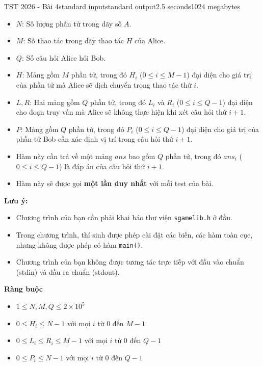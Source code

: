 \begin{problem}{TST 2026 - Bài 4}{standard input}{standard output}{2.5 seconds}{1024 megabytes}
\begin{itemize}
    \item $N$: Số lượng phần tử trong dãy số $A$.
    \item $M$: Số thao tác trong dãy thao tác $H$ của Alice.
    \item $Q$: Số câu hỏi Alice hỏi Bob.
    \item $H$: Mảng gồm $M$ phần tử, trong đó $H_i$ ($0\le i\le M-1$) đại diện cho giá trị của phần tử mà Alice sẽ dịch chuyển trong thao tác thứ $i$.
    \item $L, R$: Hai mảng gồm $Q$ phần tử, trong đó $L_i$ và $R_i$ ($0\le i\le Q-1$) đại diện cho đoạn truy vấn mà Alice sẽ không thực hiện khi xét câu hỏi thứ $i+1$.
    \item $P$: Mảng gồm $Q$ phần tử, trong đó $P_i$ ($0\le i\le Q-1$) đại diện cho giá trị của phần tử Bob cần xác định vị trí trong câu hỏi thứ $i+1$.
    \item Hàm này cần trả về một mảng $ans$ bao gồm $Q$ phần tử, trong đó $ans_i$ ($0\le i\le Q-1$) là đáp án của câu hỏi thứ $i+1$.
    \item Hàm này sẽ được gọi \textbf{một lần duy nhất} với mỗi test của bài.
\end{itemize}

\textbf{Lưu ý:}
\begin{itemize}
    \item Chương trình của bạn cần phải khai báo thư viện \texttt{sgamelib.h} ở đầu.
    \item Trong chương trình, thí sinh được phép cài đặt các biến, các hàm toàn cục, nhưng không được phép có hàm \texttt{main()}.
   \item Chương trình của bạn không được tương tác trực tiếp với đầu vào chuẩn (stdin) và đầu ra chuẩn (stdout).
\end{itemize}

\textbf{Ràng buộc}

\begin{itemize}
    \item $1\le N, M, Q \le 2\times 10^5$
    \item $0\le H_i \le N-1$ với mọi $i$ từ $0$ đến $M-1$
    \item $0\le L_i \le R_i \le M-1$ với mọi $i$ từ $0$ đến $Q-1$
    \item $0\le P_i \le N-1$ với mọi $i$ từ $0$ đến $Q-1$
\end{itemize}


\end{problem}
